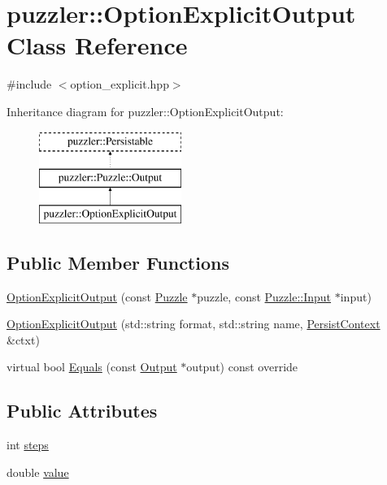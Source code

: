 \hypertarget{a00020}{}\section{puzzler\+:\+:Option\+Explicit\+Output Class Reference}
\label{a00020}


{\ttfamily \#include $<$option\+\_\+explicit.\+hpp$>$}

Inheritance diagram for puzzler\+:\+:Option\+Explicit\+Output\+:\begin{figure}[H]
\begin{center}
\leavevmode
\includegraphics[height=3.000000cm]{a00020}
\end{center}
\end{figure}
\subsection*{Public Member Functions}
\begin{DoxyCompactItemize}
\item 
\hyperlink{a00020_a72649bdc984a494435893bd366771271}{Option\+Explicit\+Output} (const \hyperlink{a00026}{Puzzle} $\ast$puzzle, const \hyperlink{a00009}{Puzzle\+::\+Input} $\ast$input)
\item 
\hyperlink{a00020_ad9ca0d088680197c8162a7943efc84e0}{Option\+Explicit\+Output} (std\+::string format, std\+::string name, \hyperlink{a00025}{Persist\+Context} \&ctxt)
\item 
virtual bool \hyperlink{a00020_ad12ffa4387fafa37298425000e6e1586}{Equals} (const \hyperlink{a00023_aa605318d3632c1b359c07745bdf17e83}{Output} $\ast$output) const override
\end{DoxyCompactItemize}
\subsection*{Public Attributes}
\begin{DoxyCompactItemize}
\item 
int \hyperlink{a00020_a4537f91041cd43bd1efebd7c21a83ca9}{steps}
\item 
double \hyperlink{a00020_a37bc5d5542984f932dc2a5f114d02f1b}{value}
\end{DoxyCompactItemize}
